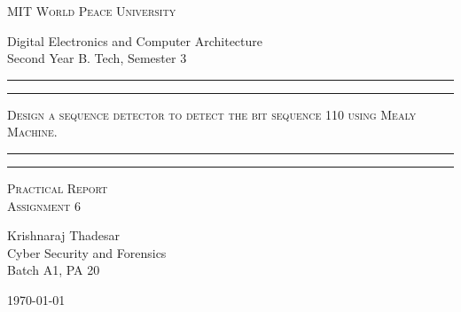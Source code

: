\documentclass[11pt]{article}
\begin{document}
\begin{titlepage}
	\centering


	\huge\textsc{
		MIT World Peace University
	}\\

	\vspace{0.75\baselineskip} %

	\LARGE{
		Digital Electronics and Computer Architecture\\
		Second Year B. Tech, Semester 3
	}

	\vfill %


	\rule{\textwidth}{1.6pt}\vspace*{-\baselineskip}\vspace*{2pt}
	\rule{\textwidth}{0.6pt}
	\vspace{0.75\baselineskip} %



	\huge{\textsc{
		Design a sequence detector to detect the bit sequence 110 using Mealy Machine.
		}} \\



	\vspace{0.5\baselineskip} %
	\rule{\textwidth}{0.6pt}\vspace*{-\baselineskip}\vspace*{2.8pt}
	\rule{\textwidth}{1.6pt}

	\vspace{1\baselineskip} %


	\LARGE\textsc{
		Practical Report\\
		Assignment 6
	} %
	\vfill


	\vspace{0.5\baselineskip} %

	\Large{
		Krishnaraj Thadesar \\
		Cyber Security and Forensics\\
		Batch A1, PA 20
	}


	\vspace{0.5\baselineskip} %
	\today

\end{titlepage}
\end{document}
